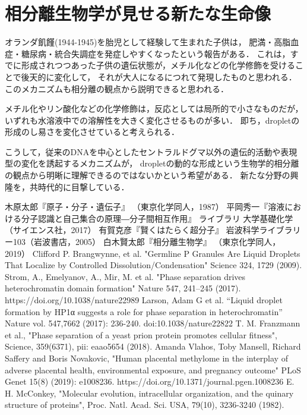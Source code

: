 \documentclass[uplatex,dvipdfmx]{jsarticle}
\begin{document}
\section{相分離生物学が見せる新たな生命像}

オランダ飢饉(1944-1945)を胎児として経験して生まれた子供は，
肥満・高脂血症・糖尿病・統合失調症を発症しやすくなったという報告がある\cite{epigenetics}．
これは，すでに形成されつつあった子供の遺伝状態が，メチル化などの化学修飾を受けることで後天的に変化して，
それが大人になるにつれて発現したものと思われる．
このメカニズムも相分離の観点から説明できると思われる．

メチル化やリン酸化などの化学修飾は，反応としては局所的で小さなものだが，
いずれも水溶液中での溶解性を大きく変化させるものが多い．
即ち，dropletの形成のし易さを変化させていると考えられる．

こうして，従来のDNAを中心としたセントラルドグマ以外の遺伝的活動や表現型の変化を誘起するメカニズムが，
dropletの動的な形成という生物学的相分離の観点から明晰に理解できるのではないかという希望がある．
新たな分野の興隆を，共時代的に目撃している．

\begin{thebibliography}{99}
        木原太郎『原子・分子・遺伝子』
        （東京化学同人，1987）
        平岡秀一『溶液における分子認識と自己集合の原理―分子間相互作用』
        ライブラリ 大学基礎化学（サイエンス社，2017）
        有賀克彦『賢くはたらく超分子』
        岩波科学ライブラリー103（岩波書店，2005）
        白木賢太郎『相分離生物学』
        （東京化学同人，2019）
        Clifford P. Brangwynne, et al. "Germline P Granules Are Liquid Droplets That Localize by Controlled Dissolution/Condensation" Science 324, 1729 (2009).
        Strom, A., Emelyanov, A., Mir, M. et al. "Phase separation drives heterochromatin domain formation" Nature 547, 241–245 (2017). https://doi.org/10.1038/nature22989
        Larson, Adam G et al. “Liquid droplet formation by HP1α suggests a role for phase separation in heterochromatin” Nature vol. 547,7662 (2017): 236-240. doi:10.1038/nature22822
        T. M. Franzmann et al., "Phase separation of a yeast prion protein promotes cellular fitness", Science, 359(6371), pii: eaao5654 (2018).
        Amanda Vlahos, Toby Mansell, Richard Saffery and Boris Novakovic, "Human placental methylome in the interplay of adverse placental health, environmental exposure, and pregnancy outcome" PLoS Genet 15(8) (2019): e1008236. https://doi.org/10.1371/journal.pgen.1008236
        E. H. McConkey, "Molecular evolution, intracellular organization, and the quinary structure of proteins", Proc. Natl. Acad. Sci. USA, 79(10), 3236-3240 (1982).
\end{thebibliography}
\end{document}
